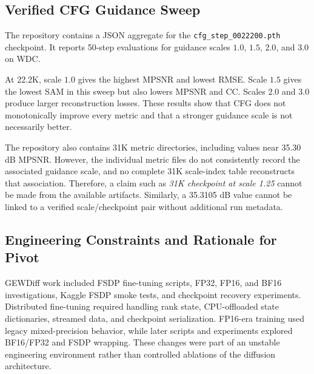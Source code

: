 \documentclass[10pt,twocolumn,letterpaper]{article}
\begin{document}
\subsection{Verified CFG Guidance Sweep}

The repository contains a JSON aggregate for the \texttt{cfg\_step\_0022200.pth} checkpoint. It reports 50-step evaluations for guidance scales $1.0$, $1.5$, $2.0$, and $3.0$ on WDC.

\begin{table}[t]
\centering
\caption{Verified 22.2K checkpoint CFG sweep.}
\label{tab:gew-cfg-222k}
\small
{}
\end{table}

At 22.2K, scale $1.0$ gives the highest MPSNR and lowest RMSE. Scale $1.5$ gives the lowest SAM in this sweep but also lowers MPSNR and CC. Scales $2.0$ and $3.0$ produce larger reconstruction losses. These results show that CFG does not monotonically improve every metric and that a stronger guidance scale is not necessarily better.

The repository also contains 31K metric directories, including values near 35.30 dB MPSNR. However, the individual metric files do not consistently record the associated guidance scale, and no complete 31K scale-index table reconstructs that association. Therefore, a claim such as \emph{31K checkpoint at scale 1.25} cannot be made from the available artifacts. Similarly, a 35.3105 dB value cannot be linked to a verified scale/checkpoint pair without additional run metadata.

\subsection{Engineering Constraints and Rationale for Pivot}

GEWDiff work included FSDP fine-tuning scripts, FP32, FP16, and BF16 investigations, Kaggle FSDP smoke tests, and checkpoint recovery experiments. Distributed fine-tuning required handling rank state, CPU-offloaded state dictionaries, streamed data, and checkpoint serialization. FP16-era training used legacy mixed-precision behavior, while later scripts and experiments explored BF16/FP32 and FSDP wrapping. These changes were part of an unstable engineering environment rather than controlled ablations of the diffusion architecture.
\end{document}
